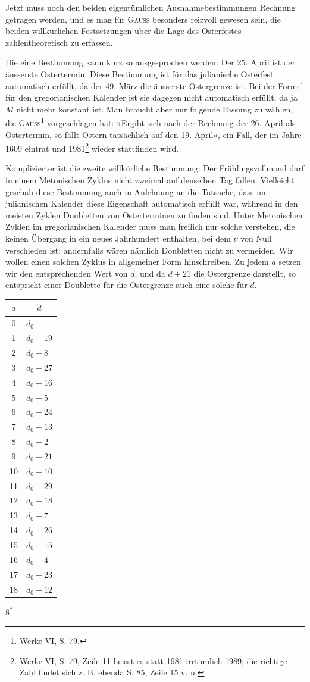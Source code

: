 Jetzt muss noch den beiden eigentümlichen Ausnahmebestimmungen Rechnung getragen werden, und es mag für \textsc{Gauss} besonders reizvoll gewesen sein,
die beiden willkürlichen Festsetzungen über die Lage des Osterfestes zahlentheoretisch zu erfassen.

Die eine Bestimmung kann kurz so ausgesprochen werden: Der 25. April
ist der äusserste Ostertermin. Diese Bestimmung ist für das julianische Osterfest automatisch erfüllt, da der 49. März die äusserste Ostergrenze ist. Bei
der Formel für den gregorianischen Kalender ist sie dagegen nicht automatisch
erfüllt, da ja $M$ nicht mehr konstant ist. Man braucht aber nur folgende
Fassung zu wählen, die \textsc{Gauss}\footnote{Werke VI, S. 79.} vorgeschlagen hat: »Ergibt sich
nach der Rechnung der 26. April als Ostertermin, so fällt Ostern
tatsächlich auf den 19. April«, ein Fall, der im Jahre 1609 eintrat und 1981\footnote{Werke VI, S. 79, Zeile 11 heisst es statt 1981 irrtümlich 1989; die richtige Zahl findet sich z. B.
ebenda S. 85, Zeile 15 v. u.} wieder stattfinden wird.

Komplizierter ist die zweite willkürliche Bestimmung: Der
Frühlingsvollmond darf in einem Metonischen Zyklus nicht
zweimal auf denselben Tag fallen. Vielleicht geschah diese
Bestimmung auch in Anlehnung an die Tatsache, dass im
julianischen Kalender diese Eigenschaft automatisch erfüllt
war, während in den meisten Zyklen Doubletten von Osterterminen zu finden sind. Unter Metonischen Zyklen im gregorianischen Kalender muss man freilich nur solche verstehen, die
keinen Übergang in ein neues Jahrhundert enthalten, bei dem $\nu$
von Null verschieden ist; andernfalls wären nämlich Doubletten
nicht zu vermeiden. Wir wollen einen solchen Zyklus in allgemeiner Form hinschreiben. Zu jedem $a$ setzen wir den entsprechenden Wert von $d$, und da $d+21$ die Ostergrenze darstellt, so entspricht einer Doublette für die Ostergrenze auch
eine solche für $d$.
\begin{center}\setlength{\tabcolsep}{7pt}\renewcommand{\arraystretch}{1.12}
\begin{tabular}{c|l}\hline\hline
$a$&\multicolumn{1}{c}{$d$}\\\hline\hline
0&$d_0$\\
1&$d_0+19$\\
2&$d_0+8$\\
3&$d_0+27$\\
4&$d_0+16$\\
5&$d_0+5$\\
6&$d_0+24$\\
7&$d_0+13$\\
8&$d_0+2$\\
9&$d_0+21$\\
10&$d_0+10$\\
11&$d_0+29$\\
12&$d_0+18$\\
13&$d_0+7$\\
14&$d_0+26$\\
15&$d_0+15$\\
16&$d_0+4$\\
17&$d_0+23$\\
18&$d_0+12$
\end{tabular}\end{center}
\par\hfill $8^{\ast}$
\clearpage\endgroup
